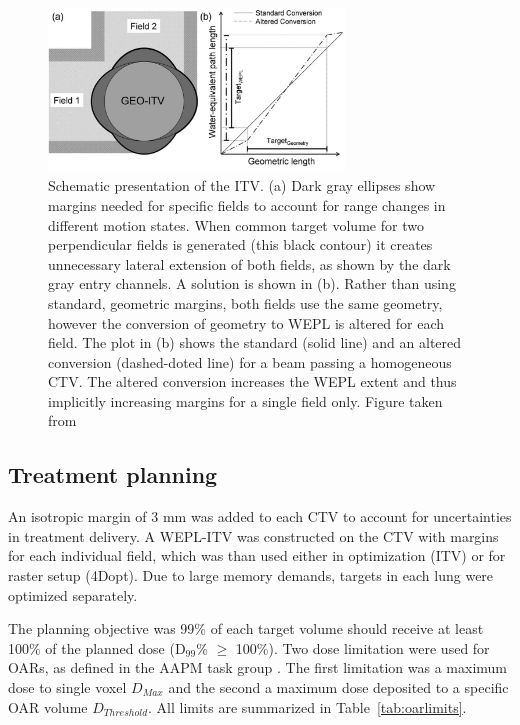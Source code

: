 \begin{figure}[H]
	\begin{center}
		\includegraphics[width=0.7\textwidth]{./ComplexPatients/Images/weplITV.png}
		\caption{Schematic presentation of the ITV. (a) Dark gray ellipses show margins needed for specific fields to account for range changes in different motion states.
		When common target volume for two perpendicular fields is generated (this black contour) it creates unnecessary lateral extension of both fields, as shown by the dark gray
		entry channels. A solution is shown in (b). Rather than using standard, geometric margins, both fields use the same geometry, however the conversion of geometry to WEPL
		is altered for each field. The plot in (b) shows the standard (solid line) and an altered conversion (dashed-doted line) for a beam passing a homogeneous CTV. The altered conversion
		increases the WEPL extent and thus implicitly increasing margins for a single field only. Figure taken from \cite{Graeff2012}}
		\label{Fig:weplITV}
	\end{center}
\end{figure}

\subsection{Treatment planning}

An isotropic margin of 3 mm was added to each CTV to account for uncertainties in treatment delivery. 
A WEPL-ITV was constructed on the CTV with margins for each individual field, which was than used either in optimization (ITV)
or for raster setup (4Dopt). Due to large memory demands, targets in each lung were optimized separately. 
  
The planning objective was 99\% of each target volume should receive at least 100\% of the planned dose (D$_{99}$\% $\geq$ 100\%). Two dose limitation were used for OARs, as defined in 
the AAPM task group \cite{Benedict2010}. The first limitation was a maximum dose to single voxel $D_{Max}$ and the second a maximum dose deposited to a 
specific OAR volume $D_{Threshold}$. All limits are summarized in Table~\ref{tab:oarlimits}.
 
